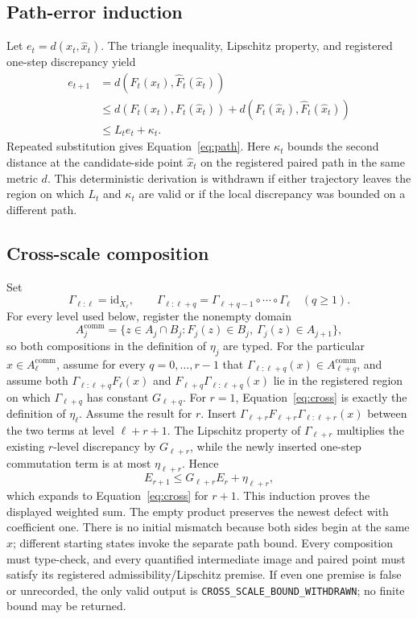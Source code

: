 \subsection{Path-error induction}

Let \(e_t=d(x_t,\widehat x_t)\). The triangle inequality, Lipschitz property, and registered
one-step discrepancy yield
\[
\begin{aligned}
e_{t+1}
&=d(F_t(x_t),\widehat F_t(\widehat x_t))\\
&\le d(F_t(x_t),F_t(\widehat x_t))
 +d(F_t(\widehat x_t),\widehat F_t(\widehat x_t))\\
&\le L_te_t+\kappa_t .
\end{aligned}
\]
Repeated substitution gives Equation~\eqref{eq:path}. Here \(\kappa_t\) bounds the second distance
at the candidate-side point \(\widehat x_t\) on the registered paired path in the same metric
\(d\). This deterministic derivation is withdrawn if either trajectory leaves the region on which
\(L_t\) and \(\kappa_t\) are valid or if the local discrepancy was bounded on a different path.

\subsection{Cross-scale composition}

Set
\[
\Gamma_{\ell:\ell}=\mathrm{id}_{X_\ell},\qquad
\Gamma_{\ell:\ell+q}=\Gamma_{\ell+q-1}\circ\cdots\circ\Gamma_\ell\quad(q\ge1).
\]
For every level used below, register the nonempty domain
\[
A_j^{\mathrm{comm}}=\{z\in A_j\cap B_j:
F_j(z)\in B_j,\ \Gamma_j(z)\in A_{j+1}\},
\]
so both compositions in the definition of \(\eta_j\) are typed. For the particular
\(x\in A_\ell^{\mathrm{comm}}\), assume for every \(q=0,\ldots,r-1\) that
\(\Gamma_{\ell:\ell+q}(x)\in A_{\ell+q}^{\mathrm{comm}}\), and assume both
\(\Gamma_{\ell:\ell+q}F_\ell(x)\) and
\(F_{\ell+q}\Gamma_{\ell:\ell+q}(x)\) lie in the registered region on which
\(\Gamma_{\ell+q}\) has constant \(G_{\ell+q}\).
For \(r=1\), Equation~\eqref{eq:cross} is exactly the definition of \(\eta_\ell\).
Assume the result for \(r\). Insert
\(\Gamma_{\ell+r}F_{\ell+r}\Gamma_{\ell:\ell+r}(x)\) between the two terms at
level \(\ell+r+1\). The Lipschitz property of \(\Gamma_{\ell+r}\) multiplies the existing
\(r\)-level discrepancy by \(G_{\ell+r}\), while the newly inserted one-step commutation
term is at most \(\eta_{\ell+r}\). Hence
\[
E_{r+1}\le G_{\ell+r}E_r+\eta_{\ell+r},
\]
which expands to Equation~\eqref{eq:cross} for \(r+1\). This induction proves the displayed
weighted sum. The empty product preserves the newest defect with coefficient one. There is no
initial mismatch because both sides begin at the same \(x\); different starting states invoke the
separate path bound. Every composition must type-check, and every quantified intermediate image
and paired point must satisfy its registered admissibility/Lipschitz premise. If even one premise
is false or unrecorded, the only valid output is
\texttt{CROSS\_SCALE\_BOUND\_WITHDRAWN}; no finite bound may be returned.

